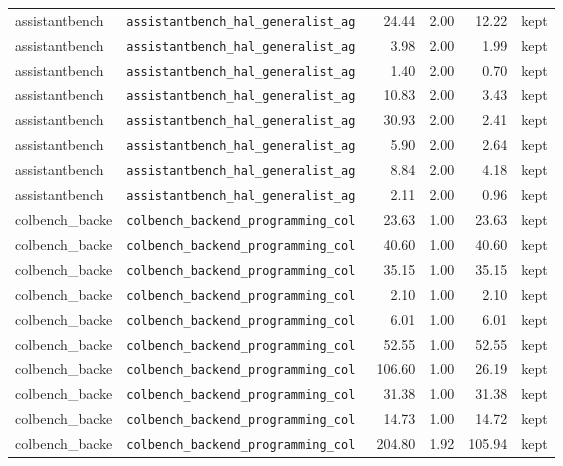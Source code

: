 {\begin{longtable}{llrrrl}
assistantbench & \texttt{\scriptsize assistantbench\_hal\_generalist\_ag~} & 24.44 & 2.00 & 12.22 & kept \\
assistantbench & \texttt{\scriptsize assistantbench\_hal\_generalist\_ag~} & 3.98 & 2.00 & 1.99 & kept \\
assistantbench & \texttt{\scriptsize assistantbench\_hal\_generalist\_ag~} & 1.40 & 2.00 & 0.70 & kept \\
assistantbench & \texttt{\scriptsize assistantbench\_hal\_generalist\_ag~} & 10.83 & 2.00 & 3.43 & kept \\
assistantbench & \texttt{\scriptsize assistantbench\_hal\_generalist\_ag~} & 30.93 & 2.00 & 2.41 & kept \\
assistantbench & \texttt{\scriptsize assistantbench\_hal\_generalist\_ag~} & 5.90 & 2.00 & 2.64 & kept \\
assistantbench & \texttt{\scriptsize assistantbench\_hal\_generalist\_ag~} & 8.84 & 2.00 & 4.18 & kept \\
assistantbench & \texttt{\scriptsize assistantbench\_hal\_generalist\_ag~} & 2.11 & 2.00 & 0.96 & kept \\
colbench\_backe & \texttt{\scriptsize colbench\_backend\_programming\_col~} & 23.63 & 1.00 & 23.63 & kept \\
colbench\_backe & \texttt{\scriptsize colbench\_backend\_programming\_col~} & 40.60 & 1.00 & 40.60 & kept \\
colbench\_backe & \texttt{\scriptsize colbench\_backend\_programming\_col~} & 35.15 & 1.00 & 35.15 & kept \\
colbench\_backe & \texttt{\scriptsize colbench\_backend\_programming\_col~} & 2.10 & 1.00 & 2.10 & kept \\
colbench\_backe & \texttt{\scriptsize colbench\_backend\_programming\_col~} & 6.01 & 1.00 & 6.01 & kept \\
colbench\_backe & \texttt{\scriptsize colbench\_backend\_programming\_col~} & 52.55 & 1.00 & 52.55 & kept \\
colbench\_backe & \texttt{\scriptsize colbench\_backend\_programming\_col~} & 106.60 & 1.00 & 26.19 & kept \\
colbench\_backe & \texttt{\scriptsize colbench\_backend\_programming\_col~} & 31.38 & 1.00 & 31.38 & kept \\
colbench\_backe & \texttt{\scriptsize colbench\_backend\_programming\_col~} & 14.73 & 1.00 & 14.72 & kept \\
colbench\_backe & \texttt{\scriptsize colbench\_backend\_programming\_col~} & 204.80 & 1.92 & 105.94 & kept \\

\end{longtable}}
